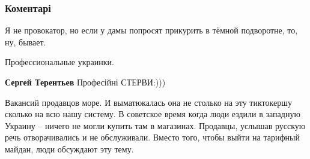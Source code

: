  
 
 
 
 
\subsubsection{Коментарі}

\begin{itemize}
 
Я не провокатор, но если у дамы попросят прикурить в тёмной подворотне, то, ну, бывает.

 
Профессиональные украинки.

\begin{itemize}
 
\textbf{Сергей Терентьев}
Професійні СТЕРВИ:)))
\end{itemize}

 

Вакансий продавцов море. И выматюкалась она не столько на эту тиктокершу
сколько на всю нашу систему. В советское время когда люди ездили в западную
Украину – ничего не могли купить там в магазинах. Продавцы, услышав русскую
речь отворачивались и не обслуживали. Вместо того, чтобы выйти на тарифный
майдан, люди обсуждают эту тему.


\end{itemize}
